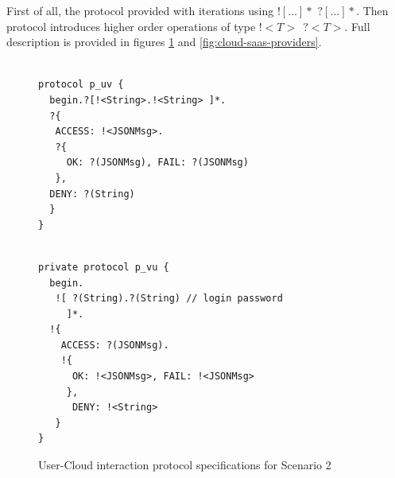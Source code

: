 \documentclass{llncs}
\begin{document}
First of all, the protocol provided with iterations using $![\dots]*$ $?[\dots]*$. Then protocol introduces higher order operations of type $!<T>\ \ ?<T>$. Full description is provided in figures \ref{fig:user-cloud-protocol} and \ref{fig:cloud-saas-providers}.
{
\lstset{
  framerule=0pt,
  numbers=none,
  basicstyle=\ttfamily\scriptsize,
}
\renewcommand\lstlistingname{Protocol}
\setcounter{lstlisting}{0}
\begin{figure}

\begin{minipage}[t]{0.50\textwidth}
\begin{lstlisting}[caption=User]

protocol p_uv { 
  begin.?[!<String>.!<String> ]*.
  ?{
   ACCESS: !<JSONMsg>.
   ?{
     OK: ?(JSONMsg), FAIL: ?(JSONMsg)
   },
  DENY: ?(String)
  } 
}

\end{lstlisting}
\end{minipage}
\begin{minipage}[t]{0.50\textwidth}
\begin{lstlisting}[caption=Cloud]

private protocol p_vu { 
  begin.
   ![ ?(String).?(String) // login password
     ]*.
  !{
    ACCESS: ?(JSONMsg).
    !{
      OK: !<JSONMsg>, FAIL: !<JSONMsg>
     },
      DENY: !<String>
   } 
}

\end{lstlisting}
\end{minipage}
\caption{User-Cloud interaction protocol specifications for Scenario 2}\label{fig:user-cloud-protocol} 
\end{figure}

}
\end{document}
